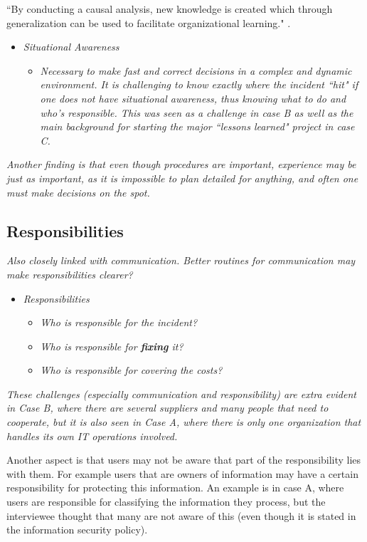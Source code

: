 ``By conducting a causal analysis, new knowledge is created which through generalization can be used to facilitate organizational learning."\cite{werlinger2010preparation}
.

\begin{itemize}
\item \textit{Situational Awareness}
\begin{itemize}
\item\textit{ Necessary to make fast and correct decisions in a complex and dynamic environment. It is challenging to know exactly where the incident ``hit" if one does not have situational awareness, thus knowing what to do and who's responsible. This was  seen as a challenge in case B as well as the main background for starting the major ``lessons learned" project in case C.}
\end{itemize}
\end{itemize}

\textit{Another finding is that even though procedures are important, experience may be just as important, as it is impossible to plan detailed for anything, and often one must make decisions on the spot.}

\subsection{Responsibilities}
\textit{Also closely linked with communication. Better routines for communication may make responsibilities clearer?}

\begin{itemize}
\item \textit{Responsibilities}
\begin{itemize}
\item \textit{Who is responsible for the incident?}
\item \textit{Who is responsible for \textbf{fixing} it?}
\item \textit{Who is responsible for covering the costs?}
\end{itemize}
\end{itemize}

\textit{These challenges (especially communication and responsibility) are extra evident in Case B, where there are several suppliers and many people that need to cooperate, but it is also seen in Case A, where there is only one organization that handles its own IT operations involved.}

Another aspect is that users may not be aware that part of the responsibility lies with them. For example users that are owners of information may have a certain responsibility for protecting this information. An example is in case A, where users are responsible for classifying the information they process, but the interviewee thought that many are not aware of this (even though it is stated in the information security policy).

